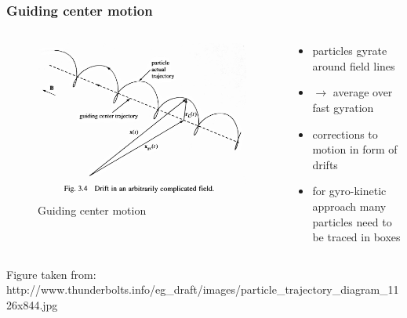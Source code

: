 \documentclass{beamer}
\begin{document}
\begin{frame}
\frametitle{Guiding center motion}
\vspace{-1 cm}
\begin{columns}[onlytextwidth]
	\begin{column}{0.45\textwidth}
		\begin{center}
		\begin{figure}
					\includegraphics[trim={0 2cm 0cm 0cm},clip,width=1.1\textwidth]{FIGURES/guiding_center.jpg}
\caption{Guiding center motion}	
\end{figure}
		\end{center}
	\end{column}
	\begin{column}{0.45\textwidth}
		\begin{center}
			\begin{itemize}
				\item particles gyrate around field lines
				\item $\rightarrow$ average over fast gyration
				\item corrections to motion in form of drifts
				\item for gyro-kinetic approach many particles need to be traced in boxes
			\end{itemize}
		\end{center}
	\end{column}
\end{columns}
\vspace{0.5cm}
\begin{footnotesize}
	{\tiny Figure taken from: http://www.thunderbolts.info/eg\_draft/images/particle\_trajectory\_diagram\_1126x844.jpg}
\end{footnotesize}
\end{frame}
\end{document}
